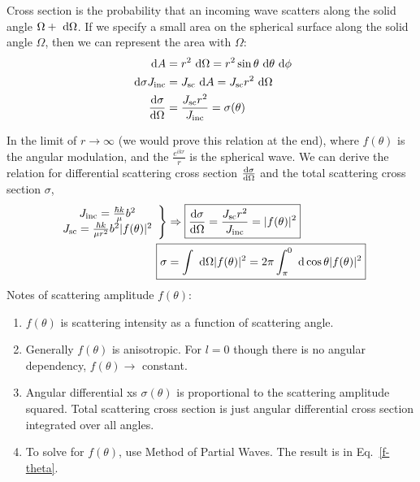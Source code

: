 \documentclass{school-22.101-notes}
\begin{document}
Cross section is the probability that an incoming wave scatters along the solid angle $\Omega+\mbox{ }\mathrm{d} \Omega$. If we specify a small area on the spherical surface along the solid angle $\Omega$, then we can represent the area with $\Omega$:
\begin{align}
\mbox{ }\mathrm{d} A &= r^2 \mbox{ }\mathrm{d} \Omega = r^2 \sin \theta \mbox{ }\mathrm{d} \theta \mbox{ }\mathrm{d} \phi \\
\mbox{ }\mathrm{d} \sigma J_{\mathrm{inc}} &= J_{\mathrm{sc}} \mbox{ }\mathrm{d} A = J_{\mathrm{sc}} r^2 \mbox{ }\mathrm{d} \Omega \\
\frac{\mathrm{d}\sigma}{\mathrm{d}\Omega} &= \frac{J_{\mathrm{sc}} r^2}{J_{\mathrm{inc}}} = \sigma(\theta) 
\end{align}

In the limit of $r \to \infty$ (we would prove this relation at the end), 
where $f(\theta)$ is the angular modulation, and the $\frac{e^{ikr}}{r}$ is the spherical wave. 
We can derive the relation for differential scattering cross section $\frac{\mathrm{d}\sigma}{\mathrm{d}\Omega}$ and the total scattering cross section $\sigma$, 
\begin{align}
\left. \begin{array}{c}
J_{\mathrm{inc}} = \frac{\hbar k}{\mu} b^2  \\
J_{\mathrm{sc}} = \frac{\hbar k}{\mu r^2} b^2 |f(\theta)|^2 \\
\end{array} \right\} & \Rightarrow \boxed{\dsigmadOmega =  \frac{J_{\mathrm{sc}} r^2}{ J_{\mathrm{inc}}} = |f(\theta)|^2 }  \\
\Aboxed{ \sigma &= \int \dOmega |f(\theta)|^2  = 2 \pi \int_{\pi}^0 \derivative \cos \theta |f(\theta)|^2 }
\end{align}
Notes of scattering amplitude $f(\theta)$: 
\begin{enumerate}
\item $f(\theta)$ is scattering intensity as a function of scattering angle.
\item Generally $f(\theta)$ is anisotropic. For $l=0$ though there is no angular dependency, $f(\theta) \to $ constant. 
\item Angular differential xs $\sigma(\theta)$ is proportional to the scattering amplitude squared. Total scattering cross section is just angular differential cross section integrated over all angles.  
\item To solve for $f(\theta)$, use Method of Partial Waves. The result is in Eq.~\ref{f-theta}. 
\end{enumerate}
\end{document}
